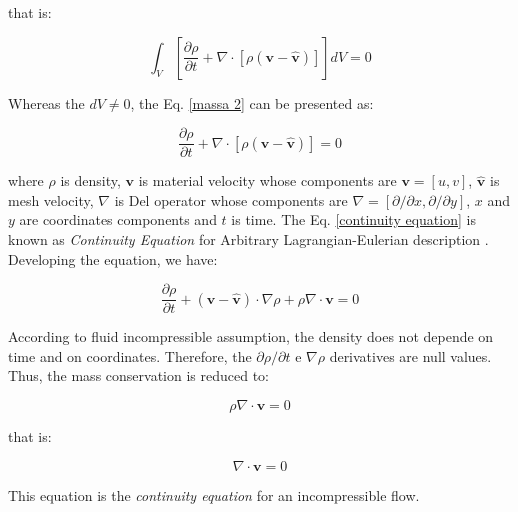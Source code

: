 \medskip
\noindent
that is:

\begin{equation} \label{massa 2}
 \int_{V} \left[ \frac{\partial \rho}{\partial t}
 + 
 \nabla \cdot 
\left[ \rho \left(\textbf{v} - \hat{\textbf{v}}\right) \right] 
\right] dV 
 = 0 
\end{equation}

\medskip
\noindent 
Whereas the $dV \neq 0$,
the Eq. \ref{massa 2} can be presented as:

\begin{equation} \label{continuity equation}
 \frac{\partial \rho}{\partial t}
 + 
 \nabla \cdot 
\left[ \rho \left(\textbf{v} - \hat{\textbf{v}}\right) \right] 
 = 0 
\end{equation}

\medskip
\noindent 
where $\rho$ is density, $\textbf{v}$ is material velocity
 whose components are $\textbf{v} = \left[u,v\right]$,
$\hat{\textbf{v}}$ is mesh velocity,
$\nabla$ is Del operator whose components are 
$\nabla = \left[ \partial/\partial x, \partial / \partial y \right]$,
$x$ and $y$ are coordinates components and
$t$ is time.
The Eq. \ref{continuity equation} is known
as \textit{Continuity Equation} 
for Arbitrary Lagrangian-Eulerian description \cite{donea1982}.
Developing the equation, we have:

\begin{equation}
 \frac{\partial \rho}{\partial t}
 +
 \left(\textbf{v} - \hat{\textbf{v}}\right) \cdot \nabla \rho
 +
 \rho \nabla \cdot \textbf{v}
 = 0
\end{equation}

\medskip
According to fluid incompressible assumption,
the density does not depende on time and on coordinates.
Therefore, the 
$\partial \rho / \partial t$ e $\nabla \rho$ derivatives are 
null values.
Thus, the mass conservation is reduced to:

\begin{equation} \label{massa 3}
 \rho \nabla \cdot \textbf{v}
 = 0 
\end{equation}

\medskip
\noindent that is:

\begin{equation} \label{incompressible continuity equation}
 \nabla \cdot \textbf{v}
 = 0 
\end{equation}

\medskip
\noindent This equation is the \textit{continuity equation} for an incompressible flow.


\newpage



